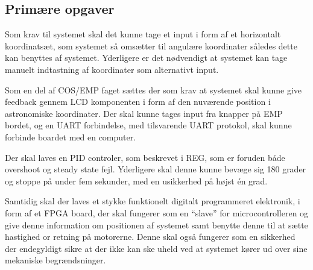 \subsection{Primære opgaver}

Som krav til systemet skal det kunne tage et input i form af et horizontalt koordinatsæt, som systemet så omsætter til angulære koordinater således dette kan benyttes af systemet. Yderligere er det nødvendigt at systemet kan tage manuelt indtastning af koordinater som alternativt input.

Som en del af COS/EMP faget sættes der som krav at systemet skal kunne give feedback gennem LCD komponenten i form af den nuværende position i astronomiske koordinater. Der skal kunne tages input fra knapper på EMP bordet, og en UART forbindelse, med tilsvarende UART protokol, skal kunne forbinde boardet med en computer.

Der skal laves en PID controler, som beskrevet i REG, som er foruden både overshoot og steady state fejl. Yderligere skal denne kunne bevæge sig 180 grader og stoppe på under fem sekunder, med en usikkerhed på højst én grad.

Samtidig skal der laves et stykke funktionelt digitalt programmeret elektronik, i form af et FPGA board, der skal fungerer som en ``slave'' for microcontrolleren og give denne information om positionen af systemet samt benytte denne til at sætte hastighed or retning på motorerne. Denne skal også fungerer som en sikkerhed der endegyldigt sikre at der ikke kan ske uheld ved at systemet kører ud over sine mekaniske begrændsninger.

